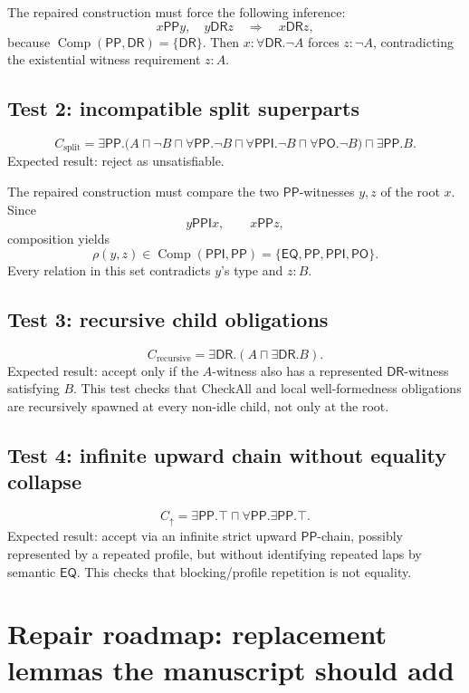 \documentclass[11pt]{article}
\newcommand{\EQ}{\mathsf{EQ}}
\newcommand{\PP}{\mathsf{PP}}
\newcommand{\PPI}{\mathsf{PPI}}
\newcommand{\PO}{\mathsf{PO}}
\newcommand{\DR}{\mathsf{DR}}
\newcommand{\Comp}{\operatorname{Comp}}
\begin{document}
The repaired construction must force the following inference:
\[
  x\PP y,\quad y\DR z
  \quad\Longrightarrow\quad
  x\DR z,
\]
because $\Comp(\PP,\DR)=\{\DR\}$.  Then $x:\forall\DR.\neg A$ forces $z:\neg A$, contradicting the existential witness requirement $z:A$.

\subsection{Test 2: incompatible split superparts}

\[
C_{\mathrm{split}}
=
\exists\PP.\bigl(A\sqcap\neg B
      \sqcap \forall\PP.\neg B
      \sqcap \forall\PPI.\neg B
      \sqcap \forall\PO.\neg B\bigr)
\sqcap
\exists\PP.B .
\]
Expected result: reject as unsatisfiable.

The repaired construction must compare the two $\PP$-witnesses $y,z$ of the root $x$.  Since
\[
  y\PPI x,\qquad x\PP z,
\]
composition yields
\[
  \rho(y,z)\in\Comp(\PPI,\PP)=\{\EQ,\PP,\PPI,\PO\}.
\]
Every relation in this set contradicts $y$'s type and $z:B$.

\subsection{Test 3: recursive child obligations}

\[
C_{\mathrm{recursive}}=\exists\DR.(A\sqcap\exists\DR.B).
\]
Expected result: accept only if the $A$-witness also has a represented $\DR$-witness satisfying $B$.  This test checks that \textsf{CheckAll} and local well-formedness obligations are recursively spawned at every non-idle child, not only at the root.

\subsection{Test 4: infinite upward chain without equality collapse}

\[
C_{\uparrow}=\exists\PP.\top\sqcap\forall\PP.\exists\PP.\top.
\]
Expected result: accept via an infinite strict upward $\PP$-chain, possibly represented by a repeated profile, but without identifying repeated laps by semantic $\EQ$.  This checks that blocking/profile repetition is not equality.

\section{Repair roadmap: replacement lemmas the manuscript should add}
\end{document}
